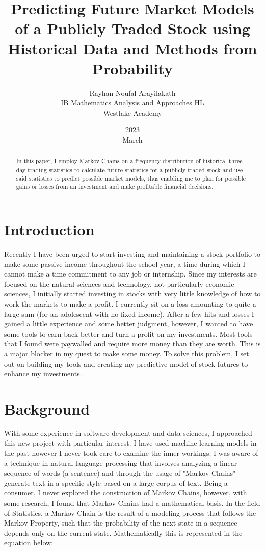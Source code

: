 \documentclass[12pt,final]{article}
\title{Predicting Future Market Models of a Publicly Traded Stock using Historical Data and Methods from Probability}
\author{Rayhan Noufal Arayilakath\\ IB Mathematics Analysis and Approaches HL\\ Westlake Academy}
\date{2023\\ March}
\begin{document}
\maketitle

\begin{abstract}
In this paper, I employ Markov Chains on a frequency distribution of historical three-day trading
statistics to calculate future statistics for a publicly traded stock and use said statistics to
predict possible market models, thus enabling me to plan for possible gains or losses from an
investment and make profitable financial decisions.
\end{abstract}

\section{Introduction}
Recently I have been urged to start investing and maintaining a stock portfolio to make some
passive income throughout the school year, a time during which I cannot make a time commitment
to any job or internship. Since my interests are focused on the natural sciences and
technology, not particularly economic sciences, I initially started investing in stocks with
very little knowledge of how to work the markets to make a profit. I currently sit on a loss
amounting to quite a large sum (for an adolescent with no fixed income). After a few hits and
losses I gained a little experience and some better judgment, however, I wanted to have some
tools to earn back better and turn a profit on my investments. Most tools that I found were
paywalled and require more money than they are worth. This is a major blocker in my
quest to make some money. To solve this problem, I set out on building my tools and
creating my predictive model of stock futures to enhance my investments.

\section{Background}
With some experience in software development and data sciences, I approached this new project
with particular interest. I have used machine learning models in the past however I never took
care to examine the inner workings. I was aware of a technique in natural-language processing
that involves analyzing a linear sequence of words (a sentence) and through the usage of "Markov
Chains" generate text in a specific style based on a large corpus of text. Being a consumer, I
never explored the construction of Markov Chains, however, with some research, I found that Markov
Chains had a mathematical basis. In the field of Statistics, a Markov Chain is the
result of a modeling process that follows the Markov Property, such that the probability of the next
state in a sequence depends only on the current state. Mathematically this is represented in
the equation below:
\end{document}
